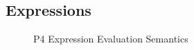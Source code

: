 \documentclass[UTF8]{article}
\begin{document}
\subsection{Expressions}

\begin{figure}[ht!]
\caption{P4 Expression Evaluation Semantics}
\label{fig:semexp}
\end{figure}
\newcommand{\expr}{\ensuremath{e}}
\end{document}
